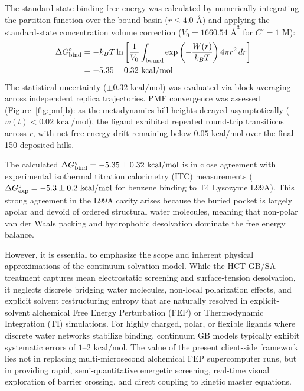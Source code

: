 \documentclass[journal=jpcbfk,manuscript=article,layout=twocolumn]{achemso}
\begin{document}
The standard-state binding free energy was calculated by numerically integrating the partition function over the bound basin ($r \le 4.0\text{ \AA}$) and applying the standard-state concentration volume correction ($V_0 = 1660.54\text{ \AA}^3$ for $C^\circ = 1\text{ M}$):
\begin{align}
\Delta G^\circ_{\rm bind} &= -k_B T \ln \left[ \frac{1}{V_0} \int_{\rm bound} \exp\left(-\frac{W(r)}{k_B T}\right) 4\pi r^2\,dr \right] \nonumber \\
&= -5.35 \pm 0.32\text{ kcal/mol}
\end{align}
The statistical uncertainty ($\pm 0.32\text{ kcal/mol}$) was evaluated via block averaging across independent replica trajectories. PMF convergence was assessed (Figure~\ref{fig:pmf}b): as the metadynamics hill heights decayed asymptotically ($w(t) < 0.02\text{ kcal/mol}$), the ligand exhibited repeated round-trip transitions across $r$, with net free energy drift remaining below $0.05\text{ kcal/mol}$ over the final 150 deposited hills.

The calculated $\Delta G^\circ_{\rm bind} = -5.35 \pm 0.32\text{ kcal/mol}$ is in close agreement with experimental isothermal titration calorimetry (ITC) measurements ($\Delta G^\circ_{\rm exp} = -5.3 \pm 0.2\text{ kcal/mol}$ for benzene binding to T4 Lysozyme L99A\cite{morton1995energetic,mobley2007predicting}). This strong agreement in the L99A cavity arises because the buried pocket is largely apolar and devoid of ordered structural water molecules, meaning that non-polar van der Waals packing and hydrophobic desolvation dominate the free energy balance. 

However, it is essential to emphasize the scope and inherent physical approximations of the continuum solvation model. While the HCT-GB/SA treatment captures mean electrostatic screening and surface-tension desolvation, it neglects discrete bridging water molecules, non-local polarization effects, and explicit solvent restructuring entropy that are naturally resolved in explicit-solvent alchemical Free Energy Perturbation (FEP) or Thermodynamic Integration (TI) simulations.\cite{boresch2003absolute,mobley2017predicting} For highly charged, polar, or flexible ligands where discrete water networks stabilize binding, continuum GB models typically exhibit systematic errors of $1\text{--}2\text{ kcal/mol}$. The value of the present client-side framework lies not in replacing multi-microsecond alchemical FEP supercomputer runs, but in providing rapid, semi-quantitative energetic screening, real-time visual exploration of barrier crossing, and direct coupling to kinetic master equations.
\end{document}

